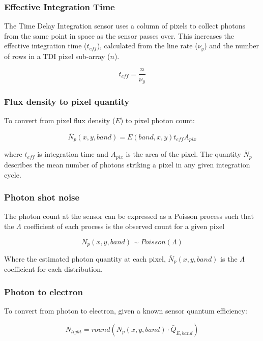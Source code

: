 \documentclass[10pt,a4paper,final,twocolumn]{article}
\begin{document}
\subsubsection{Effective Integration Time}
The Time Delay Integration sensor uses a column of pixels to collect photons from the same point in space as the sensor passes over. This increases the effective integration time ($t_{eff}$), calculated from the line rate ($\nu_{y}$) and the number of rows in a TDI pixel sub-array ($n$).

\begin{equation}
t_{eff} = \frac{n}{\nu_{y}}
\end{equation}

\subsubsection{Flux density to pixel quantity}
To convert from pixel flux density ($E$) to pixel photon count:

\begin{equation}
\bar{N}_{p}(x, y, band) =  E(band, x, y) t_{eff} A_{pix}
\end{equation}

where $t_{eff}$ is integration time and $A_{pix}$ is the area of the pixel. The quantity $\bar{N}_{p} $  describes the mean number of photons striking a pixel in any given integration cycle.

\subsubsection{Photon shot noise}
The photon count at the sensor can be expressed as a Poisson process such that the $\Lambda$ coefficient of each process is the observed count for a given pixel

\begin{equation}
N_{p}(x, y, band) \sim Poisson(\Lambda)
\end{equation}

Where the estimated photon quantity at each pixel, $\bar{N}_{p}(x, y, band) $ is the $\Lambda$ coefficient for each distribution.

\subsubsection{Photon to electron}
To convert from photon to electron, given a known sensor quantum efficiency:

\begin{equation}
N_{light}=  round(N_{p}(x, y, band) \cdot \bar{Q}_{E,band})
\end{equation}
\end{document}
